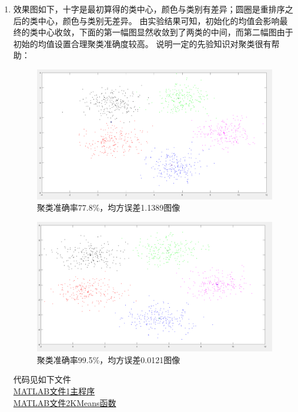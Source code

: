 \documentclass[a4paper,11pt,onecolumn,oneside,UTF8]{article}
\begin{document}
\begin{enumerate}
      \item
            效果图如下，十字是最初算得的类中心，颜色与类别有差异；圆圈是重排序之后的类中心，颜色与类别无差异。
            由实验结果可知，初始化的均值会影响最终的类中心收敛，下面的第一幅图显然收敛到了两类的中间，而第二幅图由于初始的均值设置合理聚类准确度较高。
            说明一定的先验知识对聚类很有帮助：\\
            \begin{figure}[H]
                  \centering
                  \includegraphics[width=.8\textwidth]{hw5_2.png}
                  \caption{ 聚类准确率77.8\%，均方误差1.1389图像 }
                  \label{img2}
            \end{figure}
            \begin{figure}[H]
                  \centering
                  \includegraphics[width=.8\textwidth]{hw5_3.png}
                  \caption{ 聚类准确率99.5\%，均方误差0.0121图像 }
                  \label{img3}
            \end{figure}
            代码见如下文件\\
            \href{https://github.com/Allenem/PatternRecognition/blob/main/hw5/PR_hw5_1.m}{MATLAB文件1主程序}\\
            \href{https://github.com/Allenem/PatternRecognition/blob/main/hw5/K_Means.m}{MATLAB文件2KMeans函数}

\end{enumerate}
\end{document}
